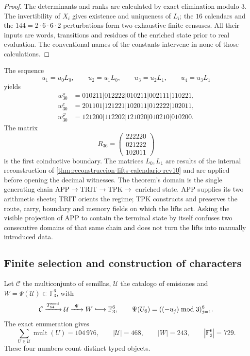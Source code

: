 \begin{proof}
The determinants and ranks are calculated by exact elimination modulo \(3\).
The invertibility of \(X_i\) gives existence and uniqueness of \(L_i\); the
\(16\) calendars and the \(144=2\cdot6\cdot6\cdot2\) perturbations form
two exhaustive finite censuses. All their inputs are words, transitions
and residues of the enriched state prior to real evaluation. The conventional
names of the constants intervene in none of those calculations.
\end{proof}

The sequence
\[
u_1=u_0L_0,\qquad u_2=u_1L_0,\qquad
u_3=u_2L_1,\qquad u_4=u_3L_1
\]
yields
\[
\begin{aligned}
w_{30}^{\pi}&=010211|012222|010211|002111|110221,\\
w_{30}^{e}&=201101|121221|102011|012222|102011,\\
w_{30}^{\varphi}&=121200|112202|121020|010210|010200.
\end{aligned}
\]
The matrix
\[
R_{36}=
\begin{pmatrix}
222220\\021222\\102011
\end{pmatrix}
\]
is the first coinductive boundary. The matrices \(L_0,L_1\) are results
of the internal reconstruction of
\cref{thm:reconstruccion-lifts-calendario-rev10} and are applied before opening
the decimal witnesses. The theorem's domain is the single generating chain
\(\mathrm{APP}\to\mathrm{TRIT}\to\mathrm{TPK}\to\) enriched state.
APP supplies its two arithmetic sheets; TRIT orients the regime; TPK constructs
and preserves the route, carry, boundary and memory fields on which the
lifts act. Asking the visible projection of APP to contain the terminal
state by itself confuses two consecutive domains of that same
chain and does not turn the lifts into manually introduced data.

\subsection{Finite selection and construction of characters}

Let \(\mathcal C\) the multiconjunto of semillas, \(\mathcal U\) the catalogo
of emisiones and \(W=\Psi(\mathcal U)\subset\mathbb F_3^6\), with
\[
 \mathcal C\xrightarrow{T_{54}^{\rm seed}}\mathcal U
 \xrightarrow{\ \Psi\ }W\lhook\joinrel\longrightarrow\mathbb F_3^6,
 \qquad
 \Psi(U_6)=((-u_j)\bmod3)_{j=1}^6.
\]
The exact enumeration gives
\[
 \sum_{U\in\mathcal U}\operatorname{mult}(U)=104\,976,\qquad
 |\mathcal U|=468,\qquad |W|=243,\qquad|\mathbb F_3^6|=729.
\]
These four numbers count distinct typed objects.

